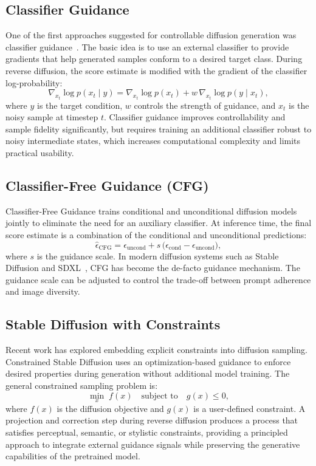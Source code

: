 \subsection{Classifier Guidance}

One of the first approaches suggested for controllable diffusion generation was classifier guidance~\cite{dhariwal2021diffusion}.
The basic idea is to use an external classifier to provide gradients that help generated samples conform to a desired target class.
During reverse diffusion, the score estimate is modified with the gradient of the classifier log-probability:
\begin{equation}
    \nabla_{x_t} \log p(x_t \mid y) = \nabla_{x_t} \log p(x_t) + w\,\nabla_{x_t} \log p(y \mid x_t),
\end{equation}
where $y$ is the target condition, $w$ controls the strength of guidance, and $x_t$ is the noisy sample at timestep $t$.
Classifier guidance improves controllability and sample fidelity significantly, but requires training an additional classifier robust to noisy intermediate states, which increases computational complexity and limits practical usability.

\subsection{Classifier-Free Guidance (CFG)}

Classifier-Free Guidance trains conditional and unconditional diffusion models jointly to eliminate the need for an auxiliary classifier.
At inference time, the final score estimate is a combination of the conditional and unconditional predictions:
\begin{equation}
    \hat{\epsilon}_{\mathrm{CFG}} = \epsilon_{\mathrm{uncond}} + s\,\bigl(\epsilon_{\mathrm{cond}} - \epsilon_{\mathrm{uncond}}\bigr),
\end{equation}
where $s$ is the guidance scale.
In modern diffusion systems such as Stable Diffusion and SDXL~\cite{podell2023sdxlimprovinglatentdiffusion}, CFG has become the de-facto guidance mechanism.
The guidance scale can be adjusted to control the trade-off between prompt adherence and image diversity.

\subsection{Stable Diffusion with Constraints}

Recent work has explored embedding explicit constraints into diffusion sampling.
Constrained Stable Diffusion uses an optimization-based guidance to enforce desired properties during generation without additional model training.
The general constrained sampling problem is:
\begin{equation}
    \min_{x}\; f(x) \quad \text{subject to} \quad g(x) \le 0,
\end{equation}
where $f(x)$ is the diffusion objective and $g(x)$ is a user-defined constraint.
A projection and correction step during reverse diffusion produces a process that satisfies perceptual, semantic, or stylistic constraints, providing a principled approach to integrate external guidance signals while preserving the generative capabilities of the pretrained model.

